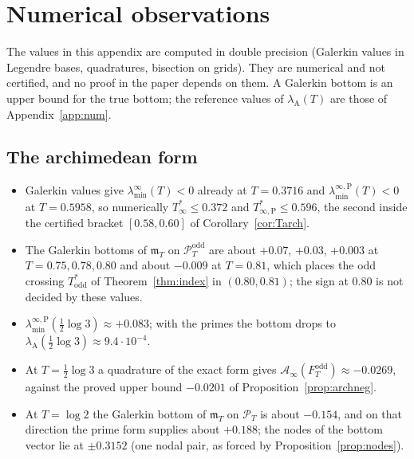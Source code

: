 \documentclass[11pt]{amsart}
\theoremstyle{definition}
\theoremstyle{remark}
\newcommand{\PT}{\mathcal P_T}
\newcommand{\lamA}{\lambda_{\mathrm A}(T)}
\newcommand{\Ainf}{\mathcal A_\infty}
\newcommand{\mT}{\mathfrak m_T}
\newcommand{\laminf}{\lambda^{\infty}_{\min}}
\newcommand{\laminfP}{\lambda^{\infty,\mathrm P}_{\min}}
\begin{document}
\section{Numerical observations}\label{app:diag}

The values in this appendix are computed in double precision (Galerkin values in Legendre bases, quadratures,
bisection on grids). They are numerical and not certified, and no proof in the paper depends on them. A Galerkin
bottom is an upper bound for the true bottom; the reference values of $\lamA$ are those of Appendix~\ref{app:num}.

\subsection{The archimedean form}
\begin{itemize}
\item Galerkin values give $\laminf(T)<0$ already at $T=0.3716$ and $\laminfP(T)<0$ at $T=0.5958$, so numerically
$T^*_\infty\le0.372$ and $T^*_{\infty,\mathrm P}\le0.596$, the second inside the certified bracket $[0.58,0.60]$ of
Corollary~\ref{cor:Tarch}.
\item The Galerkin bottoms of $\mT$ on $\PT^{\mathrm{odd}}$ are about $+0.07$, $+0.03$, $+0.003$ at $T=0.75,0.78,0.80$ and
about $-0.009$ at $T=0.81$, which places the odd crossing $T^*_{\mathrm{odd}}$ of Theorem~\ref{thm:index} in $(0.80,0.81)$;
the sign at $0.80$ is not decided by these values.
\item $\laminfP(\frac12\log3)\approx+0.083$; with the primes the bottom drops to $\lambda_{\mathrm A}(\frac12\log3)\approx9.4\cdot10^{-4}$.
\item At $T=\frac12\log3$ a quadrature of the exact form gives $\Ainf(F^{\mathrm{odd}}_T)\approx-0.0269$, against the
proved upper bound $-0.0201$ of Proposition~\ref{prop:archneg}.
\item At $T=\log2$ the Galerkin bottom of $\mT$ on $\PT$ is about $-0.154$, and on that direction the prime form
supplies about $+0.188$; the nodes of the bottom vector lie at $\pm0.3152$ (one nodal pair, as forced by
Proposition~\ref{prop:nodes}).
\end{itemize}
\end{document}
